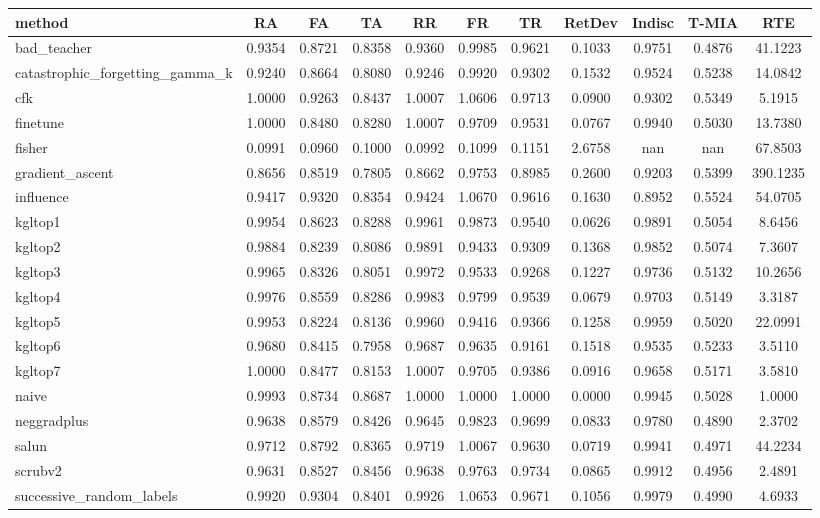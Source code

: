 \begin{tabular}{lcccccccccc}
\toprule
method & RA & FA & TA & RR & FR & TR & RetDev & Indisc & T-MIA & RTE \\
\midrule
bad_teacher & 0.9354 & 0.8721 & 0.8358 & 0.9360 & 0.9985 & 0.9621 & 0.1033 & 0.9751 & 0.4876 & 41.1223 \\
catastrophic_forgetting_gamma_k & 0.9240 & 0.8664 & 0.8080 & 0.9246 & 0.9920 & 0.9302 & 0.1532 & 0.9524 & 0.5238 & 14.0842 \\
cfk & 1.0000 & 0.9263 & 0.8437 & 1.0007 & 1.0606 & 0.9713 & 0.0900 & 0.9302 & 0.5349 & 5.1915 \\
finetune & 1.0000 & 0.8480 & 0.8280 & 1.0007 & 0.9709 & 0.9531 & 0.0767 & 0.9940 & 0.5030 & 13.7380 \\
fisher & 0.0991 & 0.0960 & 0.1000 & 0.0992 & 0.1099 & 0.1151 & 2.6758 & nan & nan & 67.8503 \\
gradient_ascent & 0.8656 & 0.8519 & 0.7805 & 0.8662 & 0.9753 & 0.8985 & 0.2600 & 0.9203 & 0.5399 & 390.1235 \\
influence & 0.9417 & 0.9320 & 0.8354 & 0.9424 & 1.0670 & 0.9616 & 0.1630 & 0.8952 & 0.5524 & 54.0705 \\
kgltop1 & 0.9954 & 0.8623 & 0.8288 & 0.9961 & 0.9873 & 0.9540 & 0.0626 & 0.9891 & 0.5054 & 8.6456 \\
kgltop2 & 0.9884 & 0.8239 & 0.8086 & 0.9891 & 0.9433 & 0.9309 & 0.1368 & 0.9852 & 0.5074 & 7.3607 \\
kgltop3 & 0.9965 & 0.8326 & 0.8051 & 0.9972 & 0.9533 & 0.9268 & 0.1227 & 0.9736 & 0.5132 & 10.2656 \\
kgltop4 & 0.9976 & 0.8559 & 0.8286 & 0.9983 & 0.9799 & 0.9539 & 0.0679 & 0.9703 & 0.5149 & 3.3187 \\
kgltop5 & 0.9953 & 0.8224 & 0.8136 & 0.9960 & 0.9416 & 0.9366 & 0.1258 & 0.9959 & 0.5020 & 22.0991 \\
kgltop6 & 0.9680 & 0.8415 & 0.7958 & 0.9687 & 0.9635 & 0.9161 & 0.1518 & 0.9535 & 0.5233 & 3.5110 \\
kgltop7 & 1.0000 & 0.8477 & 0.8153 & 1.0007 & 0.9705 & 0.9386 & 0.0916 & 0.9658 & 0.5171 & 3.5810 \\
naive & 0.9993 & 0.8734 & 0.8687 & 1.0000 & 1.0000 & 1.0000 & 0.0000 & 0.9945 & 0.5028 & 1.0000 \\
neggradplus & 0.9638 & 0.8579 & 0.8426 & 0.9645 & 0.9823 & 0.9699 & 0.0833 & 0.9780 & 0.4890 & 2.3702 \\
salun & 0.9712 & 0.8792 & 0.8365 & 0.9719 & 1.0067 & 0.9630 & 0.0719 & 0.9941 & 0.4971 & 44.2234 \\
scrubv2 & 0.9631 & 0.8527 & 0.8456 & 0.9638 & 0.9763 & 0.9734 & 0.0865 & 0.9912 & 0.4956 & 2.4891 \\
successive_random_labels & 0.9920 & 0.9304 & 0.8401 & 0.9926 & 1.0653 & 0.9671 & 0.1056 & 0.9979 & 0.4990 & 4.6933 \\
\bottomrule
\end{tabular}
